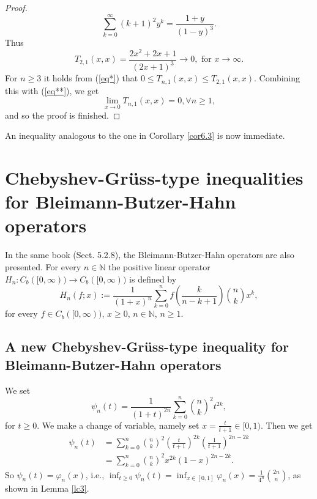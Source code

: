 \documentclass[12pt,leqno,a4paper,dvips,twoside]{article}
\newcommand*{\N}{\ensuremath{\mathbb{N}}}               %
\begin{document}
{\begin{proof}
		\begin{equation*}
			\sum^{\infty}_{k=0}{(k+1)^2 y^{k}}=\frac{1+y}{(1-y)^3}.
		\end{equation*}
	Thus 
		\begin{equation}\label{eq**}		
		T_{2,1}(x,x)=\frac{2x^2+2x+1}{(2x+1)^3}\to 0,\text{ for } x\to \infty. 
		\end{equation}
	For $n\geq 3$ it holds from (\ref{eq*}) that $0\leq T_{n,1}(x,x)\leq T_{2,1}(x,x)$. Combining this with (\ref{eq**}), we get
		\begin{equation*}
			\lim_{x\to 0}T_{n,1}(x,x)=0, \forall n\geq 1, 
		\end{equation*} 
	and so the proof is finished. 
\end{proof}

An inequality analogous to the one in Corollary \ref{cor6.3} is now immediate.

\section{Chebyshev-Gr\"{u}ss-type inequalities for Bleimann-Butzer-Hahn operators}

In the same book \cite{altomare:1994} (Sect. 5.2.8), the Bleimann-Butzer-Hahn operators are also presented. 
For every $n\in\N$ the positive linear operator $H_n:C_b([0,\infty))\to C_b([0,\infty))$ is defined by 
	\begin{equation*}
		H_n(f;x):=\frac{1}{(1+x)^n}\sum^{n}_{k=0}{f\left(\frac{k}{n-k+1}\right)\binom{n}{k}x^k},
	\end{equation*}
for every $f\in C_b([0,\infty))$, $x\geq 0$, $n\in\N$, $n\geq 1$.

\subsection{A new Chebyshev-Gr\"{u}ss-type inequality for Bleimann-Butzer-Hahn operators}

We set 
	\begin{equation*}
		\psi_n(t)=\frac{1}{(1+t)^{2n}}\sum^{n}_{k=0}{\binom{n}{k}^2t^{2k}},
	\end{equation*}
for  $t\geq 0$. We make a change of variable, namely set $x=\frac{t}{t+1}\in[0,1)$. Then we get
	\begin{align*}
		\psi_n(t)&=\sum^{n}_{k=0}{\binom{n}{k}^2\left(\frac{t}{t+1}\right)^{2k}\left(\frac{1}{t+1}\right)^{2n-2k}}\\
		&=\sum^{n}_{k=0}{\binom{n}{k}^2x^{2k}(1-x)^{2n-2k}}.
	\end{align*}
So $\psi_n(t)=\varphi_n(x)$, i.e., $\inf_{t\geq 0}\psi_n(t)=\inf_{x\in[0,1]}\varphi_n(x)=\frac{1}{4^n}\binom{2n}{n}$, as shown in Lemma \ref{lc3}.

}
\end{document}
